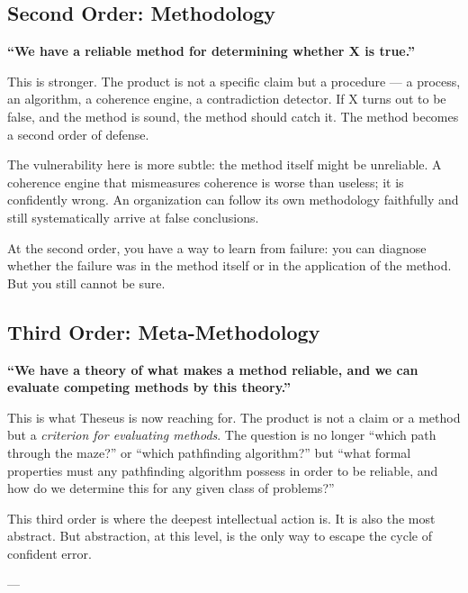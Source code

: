 \documentclass[11pt,letterpaper]{article}
\begin{document}
\subsection*{Second Order: Methodology}

\noindent \textbf{``We have a reliable method for determining whether X is true.''}

This is stronger. The product is not a specific claim but a procedure — a process, an algorithm, a coherence engine, a contradiction detector. If X turns out to be false, and the method is sound, the method should catch it. The method becomes a second order of defense.

The vulnerability here is more subtle: the method itself might be unreliable. A coherence engine that mismeasures coherence is worse than useless; it is confidently wrong. An organization can follow its own methodology faithfully and still systematically arrive at false conclusions.

At the second order, you have a way to learn from failure: you can diagnose whether the failure was in the method itself or in the application of the method. But you still cannot be sure.

\subsection*{Third Order: Meta-Methodology}

\noindent \textbf{``We have a theory of what makes a method reliable, and we can evaluate competing methods by this theory.''}

This is what Theseus is now reaching for. The product is not a claim or a method but a \emph{criterion for evaluating methods}. The question is no longer ``which path through the maze?'' or ``which pathfinding algorithm?'' but ``what formal properties must any pathfinding algorithm possess in order to be reliable, and how do we determine this for any given class of problems?''

This third order is where the deepest intellectual action is. It is also the most abstract. But abstraction, at this level, is the only way to escape the cycle of confident error.

---

\newpage

\end{document}
